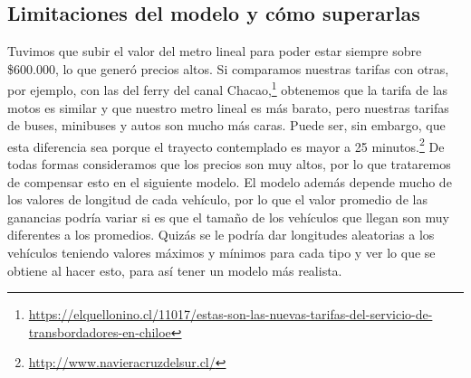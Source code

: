 \documentclass[a4paper]{article}
\begin{document}
\subsection{Limitaciones del modelo y cómo superarlas}
Tuvimos que subir el valor del metro lineal para poder estar siempre sobre \$600.000, lo que generó precios altos.  Si comparamos nuestras tarifas con otras, por ejemplo, con las del ferry del canal Chacao,\footnote{\url{https://elquellonino.cl/11017/estas-son-las-nuevas-tarifas-del-servicio-de-transbordadores-en-chiloe}} obtenemos que la tarifa de las motos es similar y que nuestro metro lineal es más barato, pero nuestras tarifas de buses, minibuses y autos son mucho más caras. Puede ser, sin embargo, que esta diferencia sea porque el trayecto contemplado es mayor a 25 minutos.\footnote{\url{ http://www.navieracruzdelsur.cl/}} De todas formas consideramos que los precios son muy altos, por lo que trataremos de compensar esto en el siguiente modelo. \newline\newline El modelo además depende mucho de los valores de longitud de cada vehículo, por lo que el valor promedio de las ganancias podría variar si es que el tamaño de los vehículos que llegan son muy diferentes a los promedios. Quizás se le podría dar longitudes aleatorias a los vehículos teniendo valores máximos y mínimos para cada tipo y ver lo que se obtiene al hacer esto, para así tener un modelo más realista.
\end{document}
